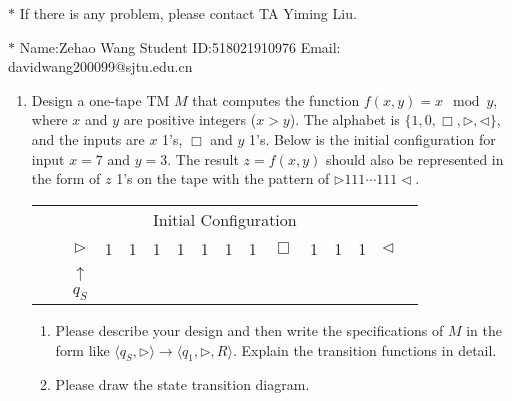 \documentclass[12pt,a4paper]{article}
\theoremstyle{definition}
\begin{document}
\noindent

\noindent{}
\begin{center}
\footnotesize{\color{red}$*$ If there is any problem, please contact TA Yiming Liu. }

\footnotesize{\color{blue}$*$ Name:Zehao Wang  \quad Student ID:518021910976 \quad Email: davidwang200099@sjtu.edu.cn}
\end{center}

\begin{enumerate}

\item
Design a one-tape TM $M$ that computes the function $f(x, y) = x \mod y$, where $x$ and $y$ are positive integers ($x > y$). The alphabet is $\{1, 0, \Box, \triangleright, \triangleleft\}$, and the inputs are $x$ 1's, $\Box$ and $y$ 1's. Below is the initial configuration for input $x=7$ and $y=3$. The result $z=f(x, y)$ should also be represented in the form of $z$ 1's on the tape with the pattern of $\triangleright 111 \cdots 111 \triangleleft$.
\begin{center}
	\begin{tabular}{ll|c|c|c|c|c|c|c|c|c|c|c|c|c|c}
		& \multicolumn{14}{c}{Initial Configuration}\\[5pt]
		\cline{2-16}
		& & $\triangleright$ &  1  & 1 & 1 & 1 & 1 & 1 & 1 & $\Box$ & 1 & 1 & 1 & $ \triangleleft$ & \\
		\cline{2-16}
		\multicolumn{2}{c}{} & \multicolumn{1}{c}{$\uparrow$} & \multicolumn{11}{c}{}\\[-4px]
		\multicolumn{2}{c}{} & \multicolumn{1}{c}{$q_S$} & \multicolumn{11}{c}{}	
	\end{tabular}
\end{center}

\begin{enumerate}
	\item
	Please describe your design and then write the specifications of $M$ in the form like $\langle q_S, \triangleright \rangle \rightarrow \langle q_1, \triangleright,  R\rangle$. Explain the transition functions in detail.
	
	\item
	Please draw the state transition diagram.
	

\end{enumerate}
\end{enumerate}
\end{document}
